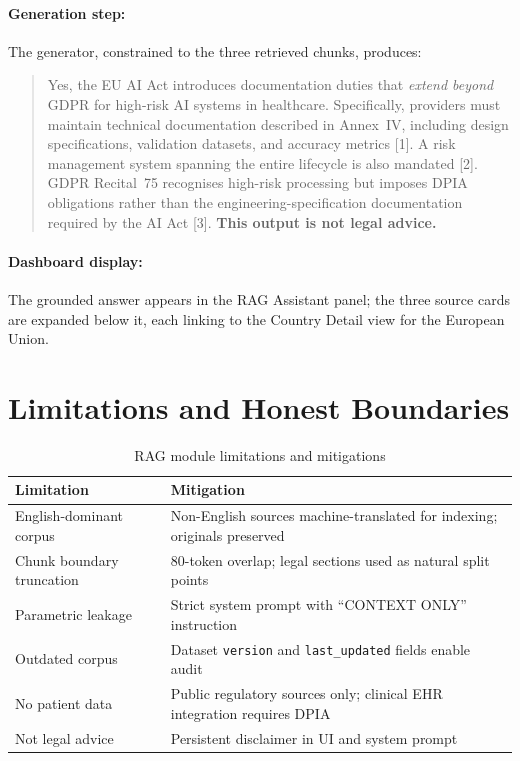 \paragraph{Generation step:}
The generator, constrained to the three retrieved chunks, produces:

\begin{quote}
\small
Yes, the EU AI Act introduces documentation duties that \emph{extend beyond} GDPR
for high-risk AI systems in healthcare. Specifically, providers must maintain
technical documentation described in Annex~IV, including design specifications,
validation datasets, and accuracy metrics [1]. A risk management system spanning
the entire lifecycle is also mandated [2]. GDPR Recital~75 recognises high-risk
processing but imposes DPIA obligations rather than the engineering-specification
documentation required by the AI Act [3]. \textbf{This output is not legal advice.}
\end{quote}

\paragraph{Dashboard display:}
The grounded answer appears in the RAG Assistant panel; the three source cards are
expanded below it, each linking to the Country Detail view for the European Union.

\section{Limitations and Honest Boundaries}
\label{sec:rag-limits-full}

\begin{table}[htbp]
\centering
\caption{RAG module limitations and mitigations}
\label{tab:rag-limits}
\begin{tabular}{@{}p{3.6cm}p{7.6cm}@{}}
\toprule
\textbf{Limitation} & \textbf{Mitigation} \\
\midrule
English-dominant corpus & Non-English sources machine-translated for indexing; originals preserved \\
Chunk boundary truncation & 80-token overlap; legal sections used as natural split points \\
Parametric leakage & Strict system prompt with ``CONTEXT ONLY'' instruction \\
Outdated corpus & Dataset \texttt{version} and \texttt{last\_updated} fields enable audit \\
No patient data & Public regulatory sources only; clinical EHR integration requires DPIA \\
Not legal advice & Persistent disclaimer in UI and system prompt \\
\bottomrule
\end{tabular}
\end{table}

